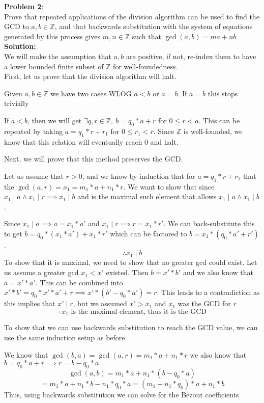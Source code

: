 \documentclass[11pt]{article}
\newcommand{\prob}[3]{\begin{flushleft}
        \textbf{Problem #1}: \\
        #2 
		\textbf{Solution:} 
		#3

\end{flushleft}}
\begin{document}
\prob{2}{
    Prove that repeated applications of the division algorithm can be used to find the GCD to $a,b \in \mathbb{Z}$, and
    that backwards substitution with the system of equations generated by this process gives $m, n \in \mathbb{Z}$ such that
    $\gcd(a,b) = ma + nb$ \\
}{ \\
    We will make the assumption that $a, b$ are positive, if not, re-index them to have a lower bounded finite subset of $\mathbb{Z}$ for well-foundedness. \\
    First, let us prove that the division algorithm will halt.

    Given $a, b \in \mathbb{Z}$ we have two cases WLOG $a < b$ or $a = b$. If $a = b$ this stops trivially

    If $a < b$, then we will get $\exists q, r \in \mathbb{Z}, \ b = q_0 * a + r$ for $0 \leq r < a$.
    This can be repeated by taking $a = q_1 * r + r_1$ for $0 \leq r_1 < r$. Since $\mathbb{Z}$ is well-founded, we know that this relation will eventually reach $0$ and halt.

    Next, we will prove that this method preserves the GCD.

    Let us assume that $r > 0$, and we know by induction that for $a = q_1 * r + r_1$ that the $\gcd(a,r) = x_1 = m_1 * a + n_1 * r$.
    We want to show that since $x_1 \mid a \land x_1 \mid r \implies x_1 \mid b$ and is the maximal such element that allows $x_1 \mid a \land x_1 \mid b$.

    Since $x_1 \mid a \implies a = x_1 * a'$ and $x_1 \mid r \implies r = x_1 * r'$. We can back-substitute this to get $b = q_0 * (x_1 * a') + x_1 * r'$ which can be factored to $b = x_1 * (q_0 * a' + r')$.
    $$\therefore x_1 \mid b$$
    To show that it is maximal, we need to show that no greater gcd could exist. Let us assume a greater gcd $x_1 < x'$ existed. Then $b = x' * b'$ and we also know that $a = x' * a'$. This can be combined into $x' * b' = q_0 * x' * a' + r \implies x' *(b' - q_0 * a') = r$.
    This leads to a contradiction as this implies that $x' \mid r$, but we assumed $x' > x_1$ and $x_1$ was the GCD for $r$
    $$\therefore \text{$x_1$ is the maximal element, thus it is the GCD}$$

    To show that we can use backwards substitution to reach the GCD value, we can use the same induction setup as before.

    We know that $\gcd(b,a) = \gcd(a,r) = m_1 * a + n_1 * r$ we also know that $b = q_0 * a + r \implies r = b - q_0 * a$
    $$\gcd(a,b) = m_1 * a + n_1 * (b - q_0 * a)$$
    $$ = m_1 * a + n_1 * b - n_1 * q_0 * a = (m_1 - n_1 * q_0) * a + n_1 * b$$
    Thus, using backwards substitution we can solve for the Bezout coefficients

}
\end{document}
